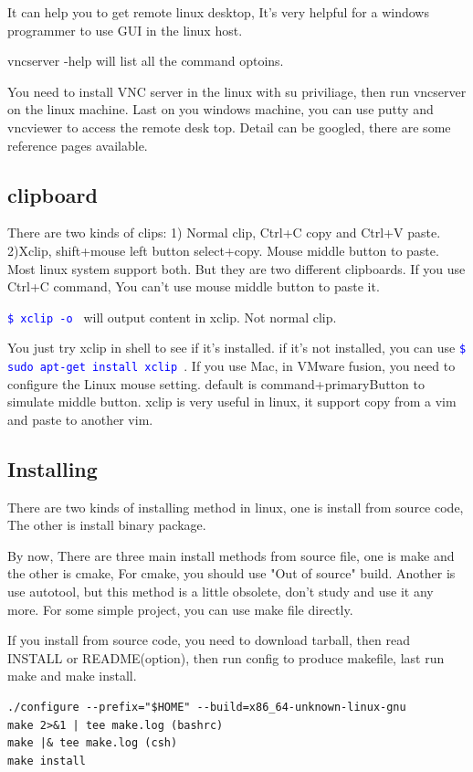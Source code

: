 \documentclass[paper=8.5in:11in, twoside, 12pt, pagesize=pdftex]{book}
\newcommand{\linuxcommand}[1]{\texttt{\textcolor{blue}{\$ #1 \Pisymbol{psy}{191}}}}
\begin{document}
 It can help you to get remote linux desktop, It's very helpful for a windows programmer to use GUI in the linux host.
 
 vncserver -help will list all the command optoins.
 
 You need to install VNC server in the linux with su priviliage, then run vncserver on the linux machine. Last on you windows machine, you can use putty and vncviewer to access the remote desk top. Detail can be googled, there are some reference pages available.


\subsection{clipboard}

			There are two kinds of clips: 1) Normal clip, Ctrl+C copy and Ctrl+V paste. 2)Xclip, shift+mouse left button select+copy. Mouse middle button to paste. Most linux system support both. But they are two different clipboards. If you use Ctrl+C command, You can't use mouse middle button to paste it.
			
			\linuxcommand{xclip -o} will output content in xclip. Not normal clip.
					
			You just try xclip in shell to see if it's installed. if it's not installed, you can use \linuxcommand{sudo apt-get install xclip}. If you use Mac, in VMware fusion, you need to configure the Linux mouse setting.  default is command+primaryButton to simulate middle button.  xclip is very useful in linux, it support copy from a vim and paste to another vim.  


\subsection{Installing}

		There are two kinds of installing method in linux, one is install from source code, The other is install binary package.

		By now, There are three main install methods from source file, one is make and the other is cmake, For cmake, you should use "Out of source" build. Another is use autotool, but this method is a little obsolete, don't study and use it any more. For some simple project, you can use make file directly. 

		If you install from source code, you need to download tarball, then read INSTALL or README(option), then run config to produce makefile, last run make and make install.
\begin{verbatim}
./configure --prefix="$HOME" --build=x86_64-unknown-linux-gnu 
make 2>&1 | tee make.log (bashrc)
make |& tee make.log (csh)
make install 	
\end{verbatim}
\end{document}
